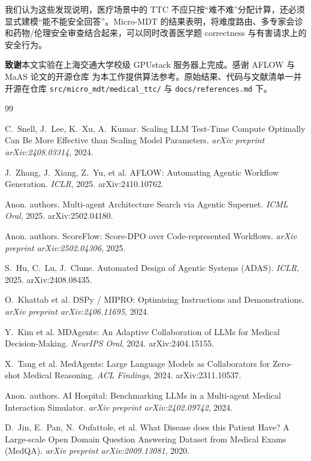 \documentclass[11pt,a4paper]{ctexart}
\begin{document}
我们认为这些发现说明，医疗场景中的 TTC 不应只按“难不难”分配计算，还必须显式建模“能不能安全回答”。Micro-MDT 的结果表明，将难度路由、多专家会诊和药物/伦理安全审查结合起来，可以同时改善医学题 correctness 与有害请求上的安全行为。

\bigskip
\noindent\textbf{致谢}\quad 本文实验在上海交通大学校级 GPUstack 服务器上完成。感谢 AFLOW 与 MaAS 论文的开源仓库 \cite{aflow2024,maas2025} 为本工作提供算法参考。原始结果、代码与文献清单一并开源在仓库 \texttt{src/micro\_mdt/medical\_ttc/} 与 \texttt{docs/references.md} 下。

\begin{thebibliography}{99}

C.~Snell, J.~Lee, K.~Xu, A.~Kumar.
Scaling LLM Test-Time Compute Optimally Can Be More Effective than Scaling Model Parameters.
\emph{arXiv preprint arXiv:2408.03314}, 2024.

J.~Zhang, J.~Xiang, Z.~Yu, et al.
AFLOW: Automating Agentic Workflow Generation.
\emph{ICLR}, 2025. arXiv:2410.10762.

Anon. authors.
Multi-agent Architecture Search via Agentic Supernet.
\emph{ICML Oral}, 2025. arXiv:2502.04180.

Anon. authors.
ScoreFlow: Score-DPO over Code-represented Workflows.
\emph{arXiv preprint arXiv:2502.04306}, 2025.

S.~Hu, C.~Lu, J.~Clune.
Automated Design of Agentic Systems (ADAS).
\emph{ICLR}, 2025. arXiv:2408.08435.

O.~Khattab et al.
DSPy / MIPRO: Optimising Instructions and Demonstrations.
\emph{arXiv preprint arXiv:2406.11695}, 2024.

Y.~Kim et al.
MDAgents: An Adaptive Collaboration of LLMs for Medical Decision-Making.
\emph{NeurIPS Oral}, 2024. arXiv:2404.15155.

X.~Tang et al.
MedAgents: Large Language Models as Collaborators for Zero-shot Medical Reasoning.
\emph{ACL Findings}, 2024. arXiv:2311.10537.

Anon. authors.
AI Hospital: Benchmarking LLMs in a Multi-agent Medical Interaction Simulator.
\emph{arXiv preprint arXiv:2402.09742}, 2024.

D.~Jin, E.~Pan, N.~Oufattole, et al.
What Disease does this Patient Have? A Large-scale Open Domain Question Answering Dataset from Medical Exams (MedQA).
\emph{arXiv preprint arXiv:2009.13081}, 2020.


\end{thebibliography}
\end{document}
